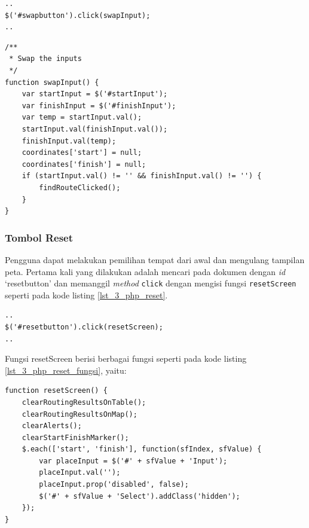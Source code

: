 \begin{lstlisting}[caption=\textit{Method} untuk memanggil fungsi JavaScript ketika tombol \textit{swap} ditekan ,label = {lst_3_php_swap}]
..
$('#swapbutton').click(swapInput);
..
\end{lstlisting}

\begin{lstlisting}[caption=Fungsi JavaScript untuk menukar isi \textit{textfield} tempat asal dan tujuan ,label = {lst_3_php_swap_fungsi}]	
/**
 * Swap the inputs
 */
function swapInput() {
	var startInput = $('#startInput');
	var finishInput = $('#finishInput');
	var temp = startInput.val();
	startInput.val(finishInput.val());
	finishInput.val(temp);
	coordinates['start'] = null;
	coordinates['finish'] = null;
	if (startInput.val() != '' && finishInput.val() != '') {
		findRouteClicked();
	}
}
\end{lstlisting}

\subsubsection{Tombol Reset}
Pengguna dapat melakukan pemilihan tempat dari awal dan mengulang tampilan peta. Pertama kali yang dilakukan adalah mencari pada dokumen dengan \textit{id} `resetbutton' dan memanggil \textit{method} \verb!click! dengan mengisi fungsi \verb!resetScreen! seperti pada kode listing \ref{lst_3_php_reset}. 

\begin{lstlisting}[caption=\textit{Method} untuk memanggil fungsi JavaScript ketika tombol \textit{reset} ditekan ,label = {lst_3_php_reset}]
..
$('#resetbutton').click(resetScreen);
..
\end{lstlisting}

Fungsi resetScreen berisi berbagai fungsi seperti pada kode listing \ref{lst_3_php_reset_fungsi}, yaitu:

\begin{lstlisting}[caption=Fungsi JavaScript resetScreen ,label = {lst_3_php_reset_fungsi}]	
function resetScreen() {
	clearRoutingResultsOnTable();
	clearRoutingResultsOnMap();
	clearAlerts();
	clearStartFinishMarker();
	$.each(['start', 'finish'], function(sfIndex, sfValue) {
		var placeInput = $('#' + sfValue + 'Input');
		placeInput.val('');	
		placeInput.prop('disabled', false);
		$('#' + sfValue + 'Select').addClass('hidden');
	});
}
\end{lstlisting}

